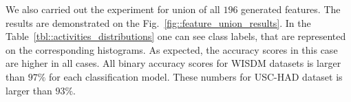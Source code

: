 \documentclass{llncs}
\begin{document}
We also carried out the experiment for union of all $196$ generated features. The results are demonstrated on the Fig.~\ref{fig::feature_union_results}. In the Table~\ref{tbl::activities_distributions} one can see class labels, that are represented on the corresponding histograms. As expected, the accuracy scores in this case are higher in all cases. All binary accuracy scores for WISDM datasets is larger than $97 \%$ for each classification model. These numbers for USC-HAD dataset is larger than $93 \%$.

\begin{figure}[!ht]
	\centering
	\\
	\\

\end{figure}
\end{document}

